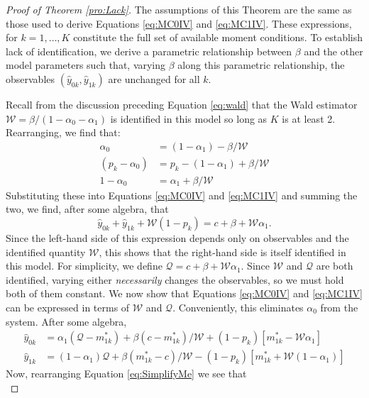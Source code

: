 \begin{proof}[Proof of Theorem \ref{pro:Lack}]
  The assumptions of this Theorem are the same as those used to derive Equations \ref{eq:MC0IV} and \ref{eq:MC1IV}. 
  These expressions, for $k = 1, \dots, K$ constitute the full set of available moment conditions.
  To establish lack of identification, we derive a parametric relationship between $\beta$ and the other model parameters such that, varying $\beta$ along this parametric relationship, the observables $(\hat{y}_{0k},\hat{y}_{1k})$ are unchanged for all $k$.   

  Recall from the discussion preceding Equation \ref{eq:wald} that the Wald estimator $\mathcal{W} = \beta/(1-\alpha_0-\alpha_1)$ is identified in this model so long as $K$ is at least 2. 
  Rearranging, we find that:
  \begin{align*}
    \alpha_0 &= (1-\alpha_1) - \beta/\mathcal{W} \\
    (p_k - \alpha_0) &= p_k - (1-\alpha_1) + \beta/\mathcal{W}\\
    1 - \alpha_0 &= \alpha_1 + \beta/\mathcal{W}
  \end{align*}
Substituting these into Equations \ref{eq:MC0IV} and \ref{eq:MC1IV} and summing the two, we find, after some algebra, that
\[\hat{y}_{0k} + \hat{y}_{1k} + \mathcal{W}(1-p_k) = c + \beta + \mathcal{W} \alpha_1.\]
Since the left-hand side of this expression depends only on observables and the identified quantity $\mathcal{W}$, this shows that the right-hand side is itself identified in this model.
For simplicity, we define $\mathcal{Q} = c + \beta + \mathcal{W}\alpha_1$.
Since $\mathcal{W}$ and $\mathcal{Q}$ are both identified, varying either \emph{necessarily} changes the observables, so we must hold both of them constant. 
We now show that Equations \ref{eq:MC0IV} and \ref{eq:MC1IV} can be expressed in terms of $\mathcal{W}$ and $\mathcal{Q}$.
Conveniently, this eliminates $\alpha_0$ from the system.
After some algebra, 
\begin{align}
  \label{eq:OtherSameEquation}
  \hat{y}_{0k} &= \alpha_1 (\mathcal{Q} - m^*_{1k}) + \beta(c-m^*_{1k})/\mathcal{W} + (1-p_k)\left[m^*_{1k} - \mathcal{W}\alpha_1\right]\\
  \hat{y}_{1k} &= (1-\alpha_1) \mathcal{Q} + \beta(m^*_{1k} - c)/\mathcal{W} - (1-p_k)\left[m^*_{1k} + \mathcal{W}(1-\alpha_1)\right]
  \label{eq:SimplifyMe}
\end{align}
Now, rearranging Equation \ref{eq:SimplifyMe} we see that
\begin{equation}

\end{equation}
\end{proof}
